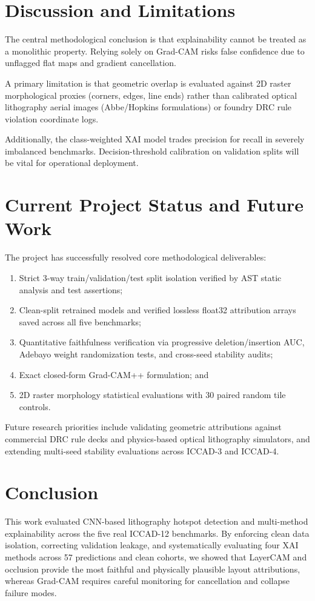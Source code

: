 \documentclass[conference]{IEEEtran}
\begin{document}
\section{Discussion and Limitations}
The central methodological conclusion is that explainability cannot be treated as a monolithic property. Relying solely on Grad-CAM risks false confidence due to unflagged flat maps and gradient cancellation.

A primary limitation is that geometric overlap is evaluated against 2D raster morphological proxies (corners, edges, line ends) rather than calibrated optical lithography aerial images (Abbe/Hopkins formulations) or foundry DRC rule violation coordinate logs.

Additionally, the class-weighted XAI model trades precision for recall in severely imbalanced benchmarks. Decision-threshold calibration on validation splits will be vital for operational deployment.

\section{Current Project Status and Future Work}
The project has successfully resolved core methodological deliverables:
\begin{enumerate}
    \item Strict 3-way train/validation/test split isolation verified by AST static analysis and test assertions;
    \item Clean-split retrained models and verified lossless float32 attribution arrays saved across all five benchmarks;
    \item Quantitative faithfulness verification via progressive deletion/insertion AUC, Adebayo weight randomization tests, and cross-seed stability audits;
    \item Exact closed-form Grad-CAM++ formulation; and
    \item 2D raster morphology statistical evaluations with 30 paired random tile controls.
\end{enumerate}

Future research priorities include validating geometric attributions against commercial DRC rule decks and physics-based optical lithography simulators, and extending multi-seed stability evaluations across ICCAD-3 and ICCAD-4.

\section{Conclusion}
This work evaluated CNN-based lithography hotspot detection and multi-method explainability across the five real ICCAD-12 benchmarks. By enforcing clean data isolation, correcting validation leakage, and systematically evaluating four XAI methods across 57 predictions and clean cohorts, we showed that LayerCAM and occlusion provide the most faithful and physically plausible layout attributions, whereas Grad-CAM requires careful monitoring for cancellation and collapse failure modes.
\end{document}
